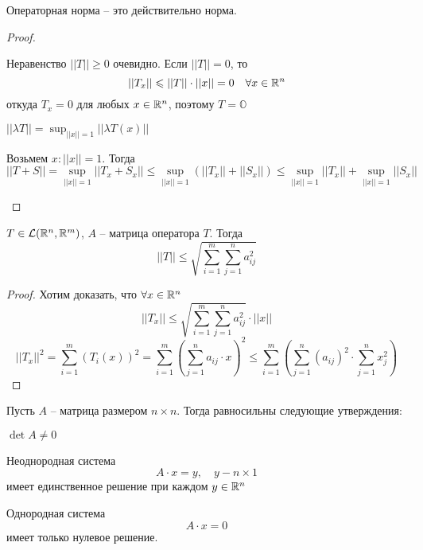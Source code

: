     \begin{Thm}
        Операторная норма -- это действительно норма.
    \end{Thm}

    \begin{proof}
        \begin{MyList} 
            \item Неравенство $||T|| \geqslant 0$ очевидно. Если $||T|| = 0$, то 
            \[||T_x|| \leqslant ||T|| \cdot ||x|| = 0 \quad \forall x \in \mathbb{R}^n\]
            откуда $T_x = 0$ для любых $x \in \mathbb{R}^n$, поэтому $T = \mathbb{O}$ 
            \item $||\lambda T|| = \displaystyle{\sup_{||x|| = 1} || \lambda T(x)||}$
            \item Возьмем $x : ||x|| = 1$. Тогда
            \[||T + S|| = \sup_{||x|| = 1} ||T_x + S_x|| \leqslant \sup_{||x|| = 1} (||T_x|| + ||S_x||)\leqslant \sup_{||x|| = 1} ||T_x|| + \sup_{||x|| = 1} ||S_x||\]
        \end{MyList}
    \end{proof}

    \begin{Thm}
        $T \in \mathcal{L}(\mathbb{R}^n, \mathbb{R}^m)$, $A$ -- матрица оператора $T$.
        Тогда
        \[||T|| \leqslant \sqrt{\sum_{i = 1}^m \sum_{j = 1}^n a_{ij}^2}\]
    \end{Thm}

    \begin{proof}
        Хотим доказать, что $\forall x \in \mathbb{R}^n$ 
        \[||T_x|| \leqslant \sqrt{\sum_{i = 1}^m \sum_{j = 1}^n a_{ij}^2} \cdot ||x||\]
        \[||T_x||^2 = \sum_{i=1}^{m} (T_i(x))^2 = \sum_{i=1}^{m} \left(\sum_{j=1}^{n} a_{ij} \cdot x\right)^2 \leqslant \sum_{i=1}^{m} \left(\sum_{j=1}^{n} (a_{ij})^2 \cdot \sum_{j=1}^{n} x_j^2\right)\]
    \end{proof}

    \begin{Thm}
        Пусть $A$ -- матрица размером $n \times n$. Тогда равносильны следующие утверждения:
        \begin{MyList} 
            \item $\det A \neq 0$ 
            \item Неоднородная система
            \[A \cdot x = y, \quad y - n \times 1\]
            имеет единственное решение при каждом $y \in \mathbb{R}^n$
            \item Однородная система 
            \[A \cdot x = 0\]
            имеет только нулевое решение.
        \end{MyList}
    \end{Thm}
